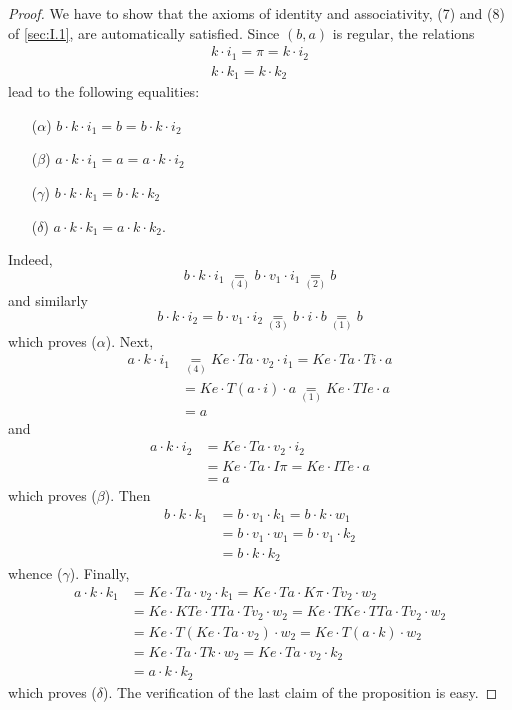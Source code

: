 \documentclass[fleqn]{article}
\newcommand{\oldpage}[1]{\marginpar{\footnotesize$\Big\vert$ \textit{p.~#1}}}
\begin{document}
\begin{proof}
  We have to show that the axioms of identity and associativity, (7) and (8) of \cref{sec:I.1}, are automatically satisfied.
  Since $(b,a)$ is regular, the relations
  \[
    \begin{gathered}
      k\cdot i_1
      = \pi
      = k\cdot i_2
    \\k\cdot k_1
      = k\cdot k_2
    \end{gathered}
  \]
  lead to the following equalities:
  \begin{enumerate}
    \item[($\alpha$)] $b\cdot k\cdot i_1=b=b\cdot k\cdot i_2$
    \item[($\beta$)] $a\cdot k\cdot i_1=a=a\cdot k\cdot i_2$
    \item[($\gamma$)] $b\cdot k\cdot k_1=b\cdot k\cdot k_2$
    \item[($\delta$)] $a\cdot k\cdot k_1=a\cdot k\cdot k_2$.
  \end{enumerate}
  Indeed,
  \oldpage{230}
  \[
    b\cdot k\cdot i_1
    \underset{(4)}{=} b\cdot v_1\cdot i_1
    \underset{(2)}{=} b
  \]
  and similarly
  \[
    b\cdot k\cdot i_2
    = b\cdot v_1\cdot i_2
    \underset{(3)}{=} b\cdot i\cdot b
    \underset{(1)}{=} b
  \]
  which proves ($\alpha$).
  Next,
  \[
    \begin{aligned}
      a\cdot k\cdot i_1
      &\underset{(4)}{=} Ke\cdot Ta\cdot v_2\cdot i_1
      = Ke\cdot Ta\cdot Ti\cdot a
    \\&= Ke\cdot T(a\cdot i)\cdot a
      \underset{(1)}{=} Ke\cdot TIe\cdot a
    \\&= a
    \end{aligned}
  \]
  and
  \[
    \begin{aligned}
      a\cdot k\cdot i_2
      &= Ke\cdot Ta\cdot v_2\cdot i_2
    \\&= Ke\cdot Ta\cdot I\pi
      =Ke\cdot ITe\cdot a
    \\&= a
    \end{aligned}
  \]
  which proves ($\beta$).
  Then
  \[
    \begin{aligned}
      b\cdot k\cdot k_1
      &= b\cdot v_1\cdot k_1
      = b\cdot k\cdot w_1
    \\&= b\cdot v_1\cdot w_1
      = b\cdot v_1\cdot k_2
    \\&= b\cdot k\cdot k_2
    \end{aligned}
  \]
  whence ($\gamma$).
  Finally,
  \[
    \begin{aligned}
      a\cdot k\cdot k_1
      &= Ke\cdot Ta\cdot v_2\cdot k_1
      = Ke\cdot Ta\cdot K\pi\cdot Tv_2\cdot w_2
    \\&= Ke\cdot KTe\cdot TTa\cdot Tv_2\cdot w_2
      = Ke\cdot TKe\cdot TTa\cdot Tv_2\cdot w_2
    \\&= Ke\cdot T(Ke\cdot Ta\cdot v_2)\cdot w_2
      = Ke\cdot T(a\cdot k)\cdot w_2
    \\&= Ke\cdot Ta\cdot Tk\cdot w_2
      = Ke\cdot Ta\cdot v_2\cdot k_2
    \\&= a\cdot k\cdot k_2
    \end{aligned}
  \]
  which proves ($\delta$).
  The verification of the last claim of the proposition is easy.
\end{proof}
\end{document}
